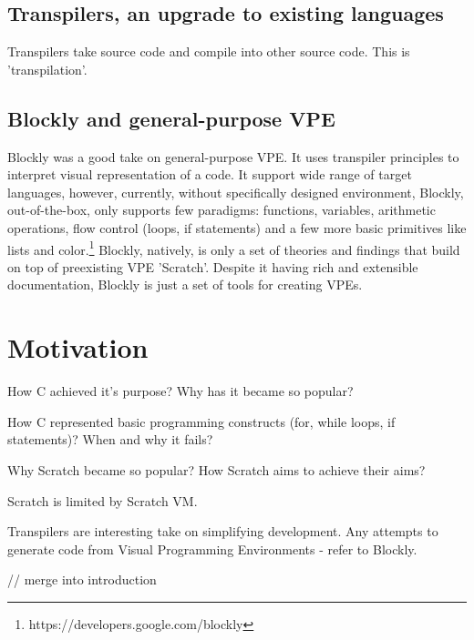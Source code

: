 \documentclass{article}
\begin{document}
\subsection{Transpilers, an upgrade to existing languages}
Transpilers take source code and compile into other source code. This is 'transpilation'.\cite{cifuentes_1998_assembly}

\subsection{Blockly and general-purpose VPE}
Blockly was a good take on general-purpose VPE. It uses transpiler principles to interpret visual representation of a code.\cite{7369000} It support wide range of target languages, however, currently, without specifically designed environment, Blockly, out-of-the-box, only supports few paradigms: functions, variables, arithmetic operations, flow control (loops, if statements) and a few more basic primitives like lists and color.\footnote{https://developers.google.com/blockly}
Blockly, natively, is only a set of theories and findings that build on top of preexisting VPE 'Scratch'.\cite{8120404} Despite it having rich and extensible documentation, Blockly is just a set of tools for creating VPEs.\cite{whitley_2006_evidence,bresson_2007_musical}





\section{Motivation}
\label{sec:motive}
How C achieved it's purpose?
Why has it became so popular?

How C represented basic programming constructs (for, while loops, if statements)?
When and why it fails?

Why Scratch became so popular?
How Scratch aims to achieve their aims?

Scratch is limited by Scratch VM.

Transpilers are interesting take on simplifying development.
Any attempts to generate code from Visual Programming Environments - refer to Blockly.

// merge into introduction
\end{document}

